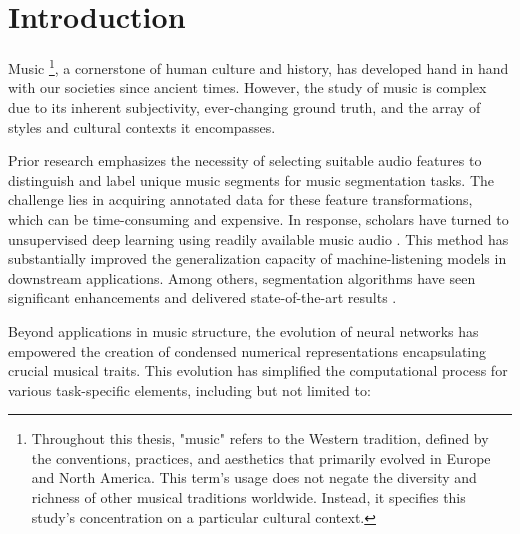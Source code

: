 \chapter{Introduction}

Music \footnote{Throughout this thesis, "music" refers to the Western tradition, defined by the conventions, practices, and aesthetics that primarily evolved in Europe and North America. This term's usage does not negate the diversity and richness of other musical traditions worldwide. Instead, it specifies this study's concentration on a particular cultural context.}, a cornerstone of human culture and history, has developed hand in hand with our societies since ancient times. However, the study of music is complex due to its inherent subjectivity, ever-changing ground truth, and the array of styles and cultural contexts it encompasses.

Prior research emphasizes the necessity of selecting suitable audio features to distinguish and label unique music segments for music segmentation tasks. The challenge lies in acquiring annotated data for these feature transformations, which can be time-consuming and expensive. In response, scholars have turned to unsupervised deep learning using readily available music audio \cite{unsupervisedlearndeepfeat, GrillMUSICANNOTATIONS}. This method has substantially improved the generalization capacity of machine-listening models in downstream applications. Among others, segmentation algorithms have seen significant enhancements and delivered state-of-the-art results \cite{Hernandez-Olivan2021MusicFeatures, Li2023MERT:Training}.

Beyond applications in music structure, the evolution of neural networks has empowered the creation of condensed numerical representations encapsulating crucial musical traits. This evolution has simplified the computational process for various task-specific elements, including but not limited to:

